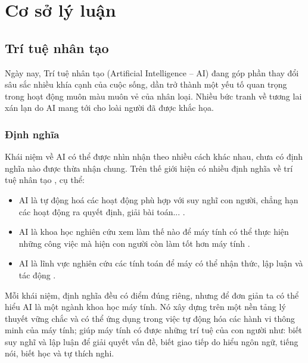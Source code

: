 \chapter{Cơ sở lý luận}

\section{Trí tuệ nhân tạo}
Ngày nay, Trí tuệ nhân tạo (Artificial Intelligence – AI) đang góp phần thay đổi sâu sắc nhiều khía cạnh của cuộc sống, dần trở thành một yếu tố quan trọng trong hoạt động muôn màu muôn vẻ của nhân loại. Nhiều bức tranh về tương lai xán lạn do AI mang tới cho loài người đã được khắc họa.\par

\subsection{Định nghĩa}
Khái niệm về AI có thể được nhìn nhận theo nhiều cách khác nhau, chưa có định nghĩa nào được thừa nhận chung. Trên thế giới hiện có nhiều định nghĩa về trí tuệ nhân tạo \cite{nguyen2018tri}, cụ thể:
\begin{itemize}
	\item AI là tự động hoá các hoạt động phù hợp với suy nghĩ con người, chẳng hạn các hoạt động ra quyết định, giải bài toán... \cite{bellman1978introduction}.
	\item AI là khoa học nghiên cứu xem làm thế nào để máy tính có thể thực hiện những công việc mà hiện con người còn làm tốt hơn máy tính \cite{rich1991artificial}.
	\item AI là lĩnh vực nghiên cứu các tính toán để máy có thể nhận thức, lập luận và tác động \cite{salin1992machine}.
\end{itemize}\par
Mỗi khái niệm, định nghĩa đều có điểm đúng riêng, nhưng để đơn giản ta có thể hiểu AI là một ngành khoa học máy tính. Nó xây dựng trên một nền tảng lý thuyết vững chắc và có thể ứng dụng trong việc tự động hóa các hành vi thông minh của máy tính; giúp máy tính có được những trí tuệ của con người như: biết suy nghĩ và lập luận để giải quyết vấn đề, biết giao tiếp do hiểu ngôn ngữ, tiếng nói, biết học và tự thích nghi.

